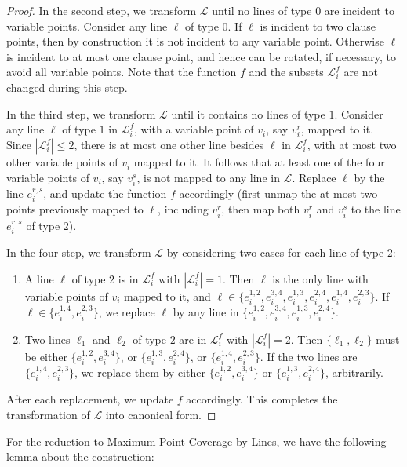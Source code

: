 \documentclass[letterpaper,11pt]{article}
\def\L{{\mathcal L}}
\begin{document}
\begin{proof}
In the second step, 
we transform $\L$ until no lines of type $0$ are incident to variable
points. Consider any line $\ell$ of type $0$.
If $\ell$ is incident to two clause points,
then by construction it is not incident to any variable point.
Otherwise $\ell$ is incident to at most one clause point,
and hence can be rotated, if necessary, to avoid all variable points.
Note that the function $f$ and the subsets $\L_i^f$
are not changed during this step.

In the third step,
we transform $\L$ until it contains no lines of type $1$.
Consider any line $\ell$ of type $1$ in $\L_i^f$,
with a variable point of $v_i$, say $v_i^r$, mapped to it.
Since $|\L_i^f| \le 2$,
there is at most one other line besides $\ell$ in $\L_i^f$,
with at most two other variable points of $v_i$ mapped to it.
It follows that at least one of the four variable points of $v_i$,
say $v_i^s$, is not mapped to any line in $\L$.
Replace $\ell$ by the line $e_i^{r,s}$, and update the function $f$ accordingly
(first unmap the at most two points previously mapped to $\ell$,
including $v_i^r$,
then map both $v_i^r$ and $v_i^s$ to the line $e_i^{r,s}$ of type $2$).

In the four step,
we transform $\L$ by considering two cases for each line of type $2$:
\begin{enumerate} \itemsep -1pt

\item
A line $\ell$ of type $2$ is in $\L_i^f$ with $|\L_i^f| = 1$.
Then $\ell$ is the only line with variable points of $v_i$ mapped to it,
and
$\ell \in \{e_i^{1,2},e_i^{3,4},e_i^{1,3},e_i^{2,4},e_i^{1,4},e_i^{2,3}\}$.
If $\ell \in \{e_i^{1,4},e_i^{2,3}\}$,
we replace $\ell$ by any line in
$\{e_i^{1,2},e_i^{3,4},e_i^{1,3},e_i^{2,4}\}$.

\item
Two lines $\ell_1$ and $\ell_2$ of type $2$ are in $\L_i^f$ with $|\L_i^f| = 2$.
Then $\{\ell_1, \ell_2\}$ must be
either $\{e_i^{1,2},e_i^{3,4}\}$,
or $\{e_i^{1,3},e_i^{2,4}\}$,
or $\{e_i^{1,4},e_i^{2,3}\}$.
If the two lines are $\{e_i^{1,4},e_i^{2,3}\}$,
we replace them by
either $\{e_i^{1,2},e_i^{3,4}\}$
or $\{e_i^{1,3},e_i^{2,4}\}$, arbitrarily.
\end{enumerate}
After each replacement,
we update $f$ accordingly.
This completes the transformation of $\L$ into canonical form.
\end{proof}

For the reduction to {\sc Maximum Point Coverage by Lines},
we have the following lemma about the construction:
\end{document}
